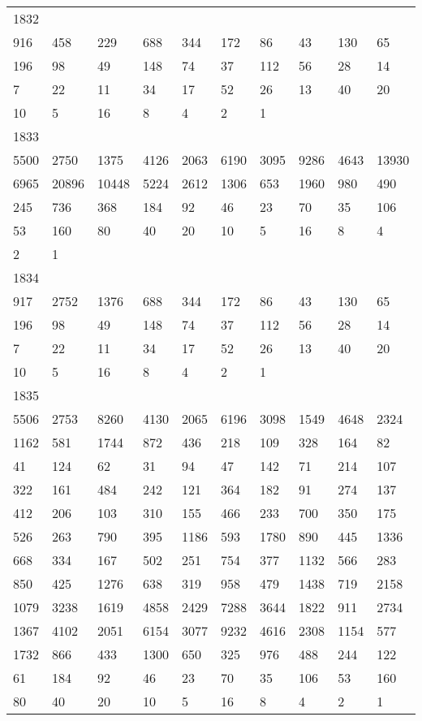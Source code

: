 \begin{longtable}{*{10}{l}}
1832&&&&&&&&&\\
916& 458& 229& 688& 344& 172& 86& 43& 130& 65\\
196& 98& 49& 148& 74& 37& 112& 56& 28& 14\\
7& 22& 11& 34& 17& 52& 26& 13& 40& 20\\
10& 5& 16& 8& 4& 2& 1& \\

1833&&&&&&&&&\\
5500& 2750& 1375& 4126& 2063& 6190& 3095& 9286& 4643& 13930\\
6965& 20896& 10448& 5224& 2612& 1306& 653& 1960& 980& 490\\
245& 736& 368& 184& 92& 46& 23& 70& 35& 106\\
53& 160& 80& 40& 20& 10& 5& 16& 8& 4\\
2& 1& \\

1834&&&&&&&&&\\
917& 2752& 1376& 688& 344& 172& 86& 43& 130& 65\\
196& 98& 49& 148& 74& 37& 112& 56& 28& 14\\
7& 22& 11& 34& 17& 52& 26& 13& 40& 20\\
10& 5& 16& 8& 4& 2& 1& \\

1835&&&&&&&&&\\
5506& 2753& 8260& 4130& 2065& 6196& 3098& 1549& 4648& 2324\\
1162& 581& 1744& 872& 436& 218& 109& 328& 164& 82\\
41& 124& 62& 31& 94& 47& 142& 71& 214& 107\\
322& 161& 484& 242& 121& 364& 182& 91& 274& 137\\
412& 206& 103& 310& 155& 466& 233& 700& 350& 175\\
526& 263& 790& 395& 1186& 593& 1780& 890& 445& 1336\\
668& 334& 167& 502& 251& 754& 377& 1132& 566& 283\\
850& 425& 1276& 638& 319& 958& 479& 1438& 719& 2158\\
1079& 3238& 1619& 4858& 2429& 7288& 3644& 1822& 911& 2734\\
1367& 4102& 2051& 6154& 3077& 9232& 4616& 2308& 1154& 577\\
1732& 866& 433& 1300& 650& 325& 976& 488& 244& 122\\
61& 184& 92& 46& 23& 70& 35& 106& 53& 160\\
80& 40& 20& 10& 5& 16& 8& 4& 2& 1\\


\end{longtable}
